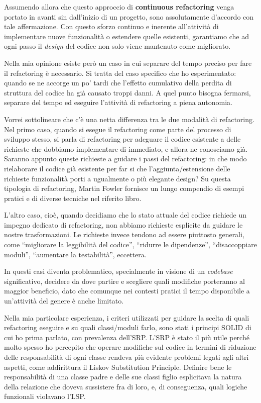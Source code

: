 \documentclass[12pt]{report}
\begin{document}
Assumendo allora che questo approccio di \textbf{continuous refactoring} venga
portato in avanti sin dall'inizio di un progetto, sono 
assolutamente d'accordo con tale affermazione. Con questo 
sforzo continuo e inerente all'attività di implementare nuove 
funzionalità o estendere quelle esistenti,
garantiamo che ad ogni passo il \textit{design} del codice non solo viene
mantenuto come migliorato.

Nella mia opinione esiste però un caso in cui separare del tempo preciso 
per fare il refactoring è necessario. Si tratta del caso specifico che
ho esperimentato: quando se ne accorge un po' tardi che l'effetto 
cumulativo della perdita di struttura del codice ha già causato
troppi danni. A quel punto bisogna fermarsi, separare del tempo 
ed eseguire l'attività di refactoring a piena autonomia.

Vorrei sottolineare che c'è una netta differenza tra le due modalità
di refactoring. Nel primo caso, quando si esegue il refactoring come
parte del processo di sviluppo stesso, si parla di refactoring per adeguare
il codice esistente a delle richieste che dobbiamo implementare di immediato,
e allora ne conosciamo già. Saranno appunto queste richieste a guidare 
i passi del refactoring: in che modo rielaborare il codice già esistente
per far si che l'aggiunta/estensione delle richieste funzionalità porti
a ugualmente o più elegante design? Su questa tipologia di refactoring,
Martin Fowler fornisce un lungo compendio di esempi pratici e di diverse
tecniche nel riferito libro\cite{fowler2003}.

L'altro caso, cioè, quando decidiamo che lo stato attuale del codice
richiede un impegno dedicato di refactoring, non abbiamo richieste esplicite
da guidare le nostre trasformazioni. Le richieste invece tendono ad essere
piuttosto generali, come ``migliorare la leggibilità del codice'', ``ridurre
le dipendenze'', ``disaccoppiare moduli'', ``aumentare la testabilità'',
eccettera.

In questi casi diventa problematico, specialmente in visione di un
\textit{codebase} significativo, decidere da dove partire e scegliere
quali modifiche porteranno al maggior beneficio, dato che comunque
nei contesti pratici il tempo disponibile a un'attività del genere è 
anche limitato.

Nella mia particolare esperienza, i criteri utilizzati per guidare la scelta
di quali refactoring eseguire e su quali classi/moduli farlo, sono stati i
principi SOLID di cui ho prima parlato, con prevalenza dell'SRP. L'SRP è
stato il più utile perché molto spesso ho percepito che operare modifiche
sul codice in termini di riduzione delle responsabilità di ogni classe
rendeva più evidente problemi legati agli altri aspetti, come addirittura
il Liskov Substitution Principle. Definire bene le responsabilità di una classe
padre e delle sue classi figlio esplicitava la natura della relazione che
doveva sussistere fra di loro, e, di conseguenza, quali logiche funzionali
violavano l'LSP. 
\end{document}

